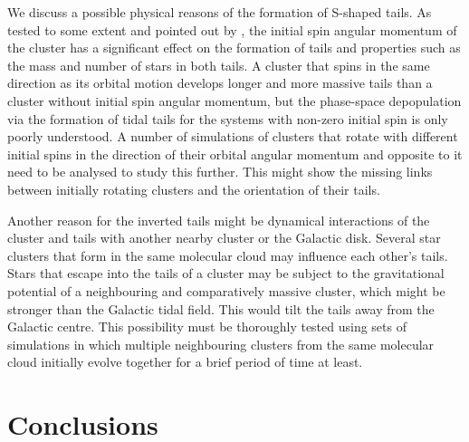 \documentclass{aa}
\newcommand{\vik}[1]{{\color{red} #1}}
\begin{document}
We discuss a possible physical reasons of the formation of S-shaped tails. As tested to some extent and pointed out by \citet{2021A&A...647A.137Jerabkova}, the initial spin angular momentum of the cluster has a significant effect on the formation of tails and properties such as the mass and number of stars in both tails. A cluster that spins in the same direction as its orbital motion develops longer and more massive tails than a cluster without initial spin angular momentum, but the phase-space depopulation via the formation of tidal tails for the systems with non-zero initial spin is only poorly understood. A number of simulations of clusters that rotate with different initial spins in the direction of their orbital angular momentum and opposite to it need to be analysed to study this further. This might show the missing links between initially rotating clusters and the orientation of their tails.

Another reason for the inverted tails might be dynamical interactions of the cluster and tails with another nearby cluster or the Galactic disk. Several star clusters that form in the same molecular cloud may influence each other's tails. Stars that escape into the tails of a cluster may be subject to the gravitational potential of a neighbouring and comparatively massive cluster, which might be stronger than the Galactic tidal field. This would tilt the tails away from the Galactic centre. This possibility must be thoroughly tested using sets of simulations in which multiple neighbouring clusters from the same molecular cloud initially evolve together for a brief period of time at least.

\section{Conclusions} \label{sec:conclusions}
\end{document}
